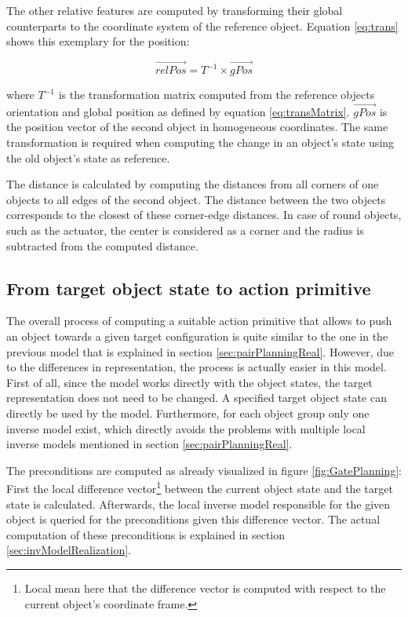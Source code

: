 The other relative features are computed by transforming their global counterparts to the coordinate system of the reference object. Equation \ref{eq:trans} shows this exemplary for the position:

\begin{equation}
	\vec{relPos} = T^{-1} \times \vec{gPos}
\label{eq:trans}
\end{equation}

where $T^{-1}$ is the transformation matrix computed from the reference objects orientation and global position as defined by equation \ref{eq:transMatrix}. $\vec{gPos}$ is the position vector of the second object in homogeneous coordinates. The same transformation is required when computing the change in an object's state using the old object's state as reference. 

The distance is calculated by computing the distances from all corners of one objects to all edges of the second object. 
The distance between the two objects corresponds to the closest of these corner-edge distances. In case of round objects, such as the actuator, the center is considered as a corner and the radius is subtracted from the computed distance.


\subsection{From target object state to action primitive \label{sec:gatePlanningReal}}

The overall process of computing a suitable action primitive that allows to push an object towards a given target configuration is quite similar to the one in the previous model that is explained in section \ref{sec:pairPlanningReal}. However, due to the differences in representation, the process is actually easier in this model. 
First of all, since the model works directly with the object states, the target representation does not need to be changed. A specified target object state can directly be used by the model. 
Furthermore, for each object group only one inverse model exist, which directly avoids the problems with multiple local inverse models mentioned in section \ref{sec:pairPlanningReal}. 

The preconditions are computed as already visualized in figure \ref{fig:GatePlanning}: \\
First the local difference vector\footnote{Local mean here that the difference vector is computed with respect to the current object's coordinate frame.} between the current object state and the target state is calculated.
Afterwards, the local inverse model responsible for the given object is queried for the preconditions given this difference vector. The actual computation of these preconditions is explained in section \ref{sec:invModelRealization}.

